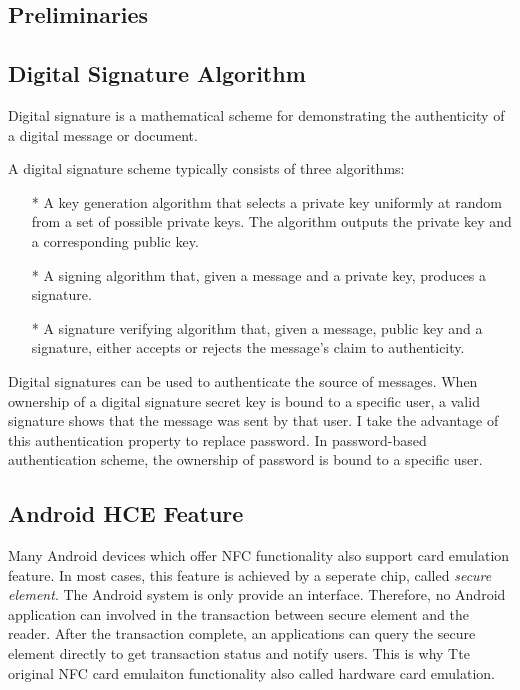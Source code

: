 \begin{CJK}{Bg5}{bsmi}


\chapter{Preliminaries}

\section{Digital Signature Algorithm}

Digital signature is a mathematical scheme for demonstrating the authenticity of a digital message or document. 

A digital signature scheme typically consists of three algorithms:

\begin{enumerate}
\item[*] A key generation algorithm that selects a private key uniformly at random from a set of possible private keys. The algorithm outputs the private key and a corresponding public key.
\item[*] A signing algorithm that, given a message and a private key, produces a signature.
\item[*] A signature verifying algorithm that, given a message, public key and a signature, either accepts or rejects the message's claim to authenticity.
\end{enumerate}

Digital signatures can be used to authenticate the source of messages. When ownership of a digital signature secret key is bound to a specific user, a valid signature shows that the message was sent by that user. I take the advantage of this authentication property to replace password. In password-based authentication scheme, the ownership of password is bound to a specific user. 

\section{Android HCE Feature}

Many Android devices which offer NFC functionality also support card emulation feature. In most cases, this feature is achieved by a seperate chip, called \emph{secure element}. The Android system is only provide an interface. Therefore, no Android application can involved in the transaction between secure element and the reader. After the transaction complete, an applications can query the secure element directly to get transaction status and notify users. This is why Tte original NFC card emulaiton functionality also called hardware card emulation.


\end{CJK}
